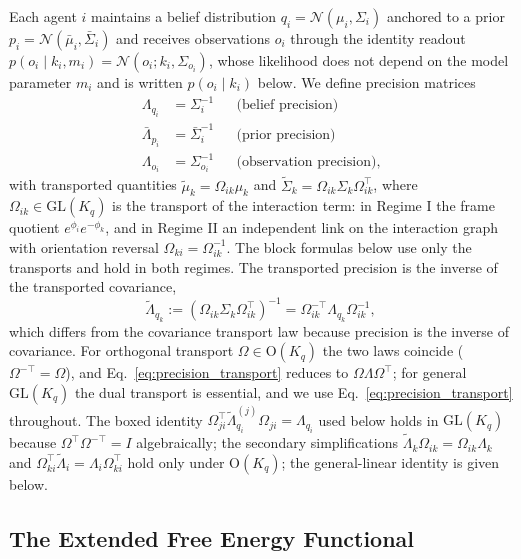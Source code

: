 \documentclass[11pt]{article}
\begin{document}
Each agent $i$ maintains a belief distribution $q_i = \mathcal{N}(\mu_i, \Sigma_i)$ anchored to a prior $p_i = \mathcal{N}(\bar{\mu}_i, \bar{\Sigma}_i)$ and receives observations $o_i$ through the identity readout $p(o_i \mid k_i, m_i) = \mathcal{N}(o_i; k_i, \Sigma_{o_i})$, whose likelihood does not depend on the model parameter $m_i$ and is written $p(o_i \mid k_i)$ below. We define precision matrices
\begin{align}
\Lambda_{q_i} &= \Sigma_i^{-1} & &\text{(belief precision)} \\
\bar{\Lambda}_{p_i} &= \bar{\Sigma}_i^{-1} & &\text{(prior precision)} \\
\Lambda_{o_i} &= \Sigma_{o_i}^{-1} & &\text{(observation precision)},
\end{align}
with transported quantities $\tilde{\mu}_k = \Omega_{ik}\mu_k$ and $\tilde{\Sigma}_k = \Omega_{ik}\Sigma_k\Omega_{ik}^\top$, where $\Omega_{ik} \in \mathrm{GL}(K_q)$ is the transport of the interaction term: in Regime I the frame quotient $e^{\phi_i}e^{-\phi_k}$, and in Regime II an independent link on the interaction graph with orientation reversal $\Omega_{ki} = \Omega_{ik}^{-1}$. The block formulas below use only the transports and hold in both regimes. The transported precision is the inverse of the transported covariance,
\begin{equation}
\tilde{\Lambda}_{q_k} := (\Omega_{ik}\Sigma_k\Omega_{ik}^\top)^{-1} = \Omega_{ik}^{-\top}\Lambda_{q_k}\Omega_{ik}^{-1},
\label{eq:precision_transport}
\end{equation}
which differs from the covariance transport law because precision is the inverse of covariance. For orthogonal transport $\Omega \in \mathrm{O}(K_q)$ the two laws coincide ($\Omega^{-\top} = \Omega$), and Eq.~\eqref{eq:precision_transport} reduces to $\Omega\Lambda\Omega^\top$; for general $\mathrm{GL}(K_q)$ the dual transport is essential, and we use Eq.~\eqref{eq:precision_transport} throughout. The boxed identity $\Omega_{ji}^\top \tilde{\Lambda}_{q_i}^{(j)} \Omega_{ji} = \Lambda_{q_i}$ used below holds in $\mathrm{GL}(K_q)$ because $\Omega^\top \Omega^{-\top} = I$ algebraically; the secondary simplifications $\tilde{\Lambda}_k\Omega_{ik} = \Omega_{ik}\Lambda_k$ and $\Omega_{ki}^\top\tilde\Lambda_i = \Lambda_i\Omega_{ki}^\top$ hold only under $\mathrm{O}(K_q)$; the general-linear identity is given below.

\subsection{The Extended Free Energy Functional}
\end{document}
